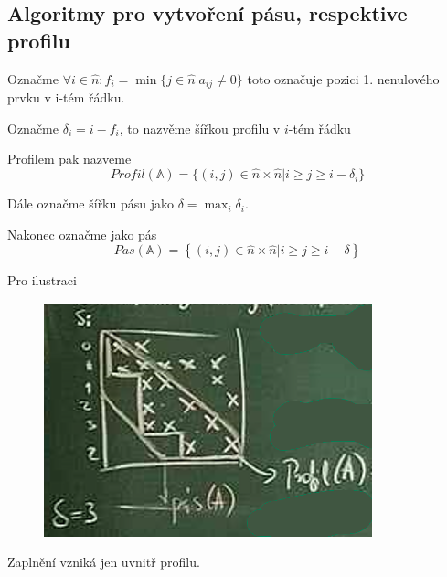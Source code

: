 \documentclass[../main.tex]{subfiles}
\begin{document}
\subsection{Algoritmy pro vytvoření pásu, respektive profilu}

Označme $\forall i\in\hat{n}: f_i = \min\{j\in\hat{n} | a_{ij} \neq 0 \}$ toto označuje 
pozici 1. nenulového prvku v i-tém řádku.

Označme $\delta_i = i - f_i$, to nazvěme šířkou profilu v $i$-tém řádku 

Profilem \matA pak nazveme
\begin{equation*}
    Profil(\mathbb{A}) = \{(i,j)\in \hat{n}\times\hat{n}| i\geq j\geq i-\delta_i  \}
\end{equation*} 

Dále označme šířku pásu jako $\delta = \max_i \delta_i$.

Nakonec označme jako pás 
\begin{equation*}
    Pas(\mathbb{A}) = \left\{ (i,j)\in \hat{n}\times\hat{n} | i\geq j\geq i - \delta   \right\} 
\end{equation*}

Pro ilustraci 
\begin{figure}[H]
    \centering
    \includegraphics{images/26-10-profilpas.png}
\end{figure}

Zaplnění vzniká jen uvnitř profilu.
\end{document}
